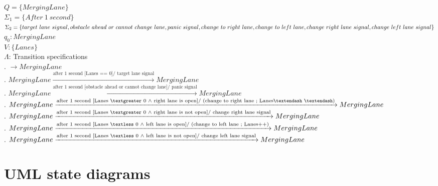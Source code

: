 \documentclass[12pt]{article}
\begin{document}
\begin{spacing}{1.5}
\noindent $Q = \{Merging Lane\}$\\
\noindent $\Sigma_1 = \{After~1~second\}$\\
\noindent $\Sigma_2 = \{target~lane~signal, obstacle~ahead~or~cannot~change~lane, panic~signal, change~to~right~lane,
\\\noindent change~to~left~lane, change~right~lane~signal, change~left~lane~signal\}$\\
\noindent $q_0: Merging Lane$\\
\noindent $V: \{Lanes\}$\\
\noindent $\Lambda$: Transition specifications\\
. $\rightarrow Merging Lane$\\
. $Merging Lane \xrightarrow {\text {after~1~second [Lanes == 0]/ target~lane~signal}} Merging Lane$\\
. $Merging Lane \xrightarrow {\text {after~1~second [obstacle~ahead~or~cannot~change~lane]/ panic~signal}} Merging Lane$\\
. $Merging Lane \xrightarrow {\text {after~1~second [Lanes $\textgreater$ 0 $\wedge$ right lane is open]/ (change~to~right~lane ; Lanes$\textendash~\textendash$)}} Merging Lane$\\
. $Merging Lane \xrightarrow {\text {after~1~second [Lanes $\textgreater$ 0 $\wedge$ right lane is not open]/ change~right~lane~signal}} Merging Lane$\\
. $Merging Lane \xrightarrow {\text {after~1~second [Lanes $\textless$ 0 $\wedge$ left lane is open]/ (change~to~left~lane ; Lanes++)}} Merging Lane$\\
. $Merging Lane \xrightarrow {\text {after~1~second [Lanes $\textless$ 0 $\wedge$ left lane is not open]/ change~left~lane~signal}} Merging Lane$\\

\newpage

\section{UML state diagrams}


\end{spacing}
\end{document}
